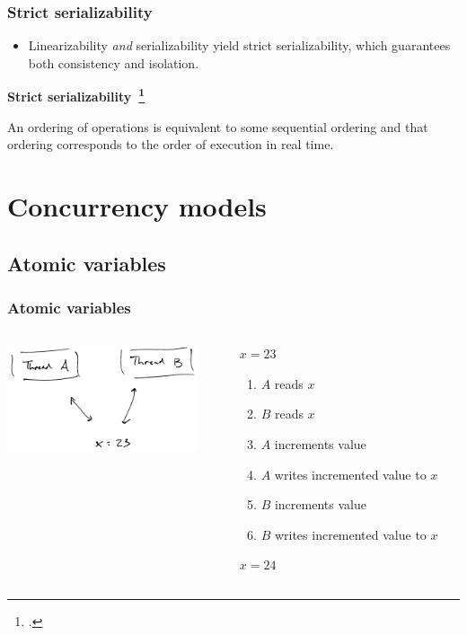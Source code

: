\documentclass[aspectratio=1610]{beamer}
\begin{document}
  \begin{frame}
    \frametitle{Strict serializability}

    \begin{itemize}
      \item Linearizability \emph{and} serializability yield strict serializability, which guarantees both consistency and isolation.
    \end{itemize}

    \vfill

    \textbf{Strict serializability~\footcite{Herlihy1990}}

    An ordering of operations is equivalent to some sequential ordering and that ordering corresponds to the order of execution in real time.
  \end{frame}


  \section{Concurrency models}

  \subsection{Atomic variables}

  \begin{frame}
    \frametitle{Atomic variables}

    \begin{columns}
      \begin{column}{0.5\textwidth}
        \centering
        \includegraphics[width=160pt]{../figures/nonatomic}
      \end{column}
      \hfill
      \begin{column}{0.5\textwidth}
        $x = 23$

        \begin{enumerate}
          \item $A$ reads $x$
          \item $B$ reads $x$
          \item $A$ increments value
          \item $A$ writes incremented value to $x$
          \item $B$ increments value
          \item $B$ writes incremented value to $x$
        \end{enumerate}

        $x = 24$
      \end{column}
    \end{columns}
  \end{frame}
\end{document}
